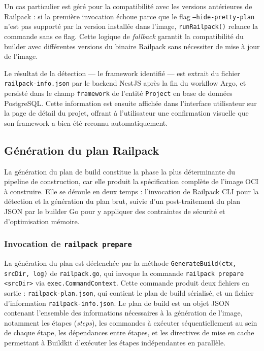 Un cas particulier est géré pour la compatibilité avec les versions antérieures de Railpack : si la première invocation échoue parce que le flag \texttt{--hide-pretty-plan} n'est pas supporté par la version installée dans l'image, \texttt{runRailpack()} relance la commande sans ce flag. Cette logique de \textit{fallback} garantit la compatibilité du builder avec différentes versions du binaire Railpack sans nécessiter de mise à jour de l'image.

Le résultat de la détection — le framework identifié — est extrait du fichier \texttt{railpack-info.json} par le backend NestJS après la fin du workflow Argo, et persisté dans le champ \texttt{framework} de l'entité \texttt{Project} en base de données PostgreSQL. Cette information est ensuite affichée dans l'interface utilisateur sur la page de détail du projet, offrant à l'utilisateur une confirmation visuelle que son framework a bien été reconnu automatiquement.

\subsection{Génération du plan Railpack}

La génération du plan de build constitue la phase la plus déterminante du pipeline de construction, car elle produit la spécification complète de l'image OCI à construire. Elle se déroule en deux temps : l'invocation de Railpack CLI pour la détection et la génération du plan brut, suivie d'un post-traitement du plan JSON par le builder Go pour y appliquer des contraintes de sécurité et d'optimisation mémoire.

\subsubsection*{Invocation de \texttt{railpack prepare}}

La génération du plan est déclenchée par la méthode \texttt{GenerateBuild(ctx, srcDir, log)} de \texttt{railpack.go}, qui invoque la commande \texttt{railpack prepare <srcDir>} via \texttt{exec.CommandContext}. Cette commande produit deux fichiers en sortie : \texttt{railpack-plan.json}, qui contient le plan de build sérialisé, et un fichier d'information \texttt{railpack-info.json}.  Le plan de build est un objet JSON contenant l'ensemble des informations nécessaires à la génération de l'image, notamment les étapes (\textit{steps}), les commandes à exécuter séquentiellement au sein de chaque étape, les dépendances entre étapes, et les directives de mise en cache permettant à Buildkit d'exécuter les étapes indépendantes en parallèle. 

